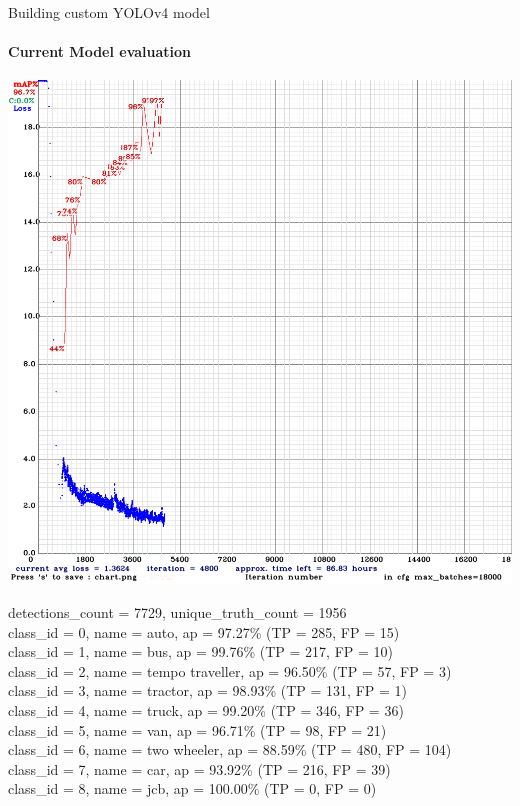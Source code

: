 \documentclass{beamer}
\begin{document}
	\begin{frame}[allowframebreaks]{Building custom YOLOv4 model}
		\framesubtitle{Current Model evaluation}
		\begin{center}
			\includegraphics[height=0.7\textheight]{res/darknet_training_chart}
		\end{center}
	
		\newpage
		\begin{scriptsize}
			detections\_count = 7729, unique\_truth\_count = 1956  \\ 
			class\_id = 0, name = auto, ap = 97.27\%   	 (TP = 285, FP = 15) \\
			class\_id = 1, name = bus, ap = 99.76\%   	 (TP = 217, FP = 10) \\
			class\_id = 2, name = tempo traveller, ap = 96.50\%   	 (TP = 57, FP = 3) \\
			class\_id = 3, name = tractor, ap = 98.93\%   	 (TP = 131, FP = 1) \\
			class\_id = 4, name = truck, ap = 99.20\%   	 (TP = 346, FP = 36) \\
			class\_id = 5, name = van, ap = 96.71\%   	 (TP = 98, FP = 21) \\
			class\_id = 6, name = two wheeler, ap = 88.59\%   	 (TP = 480, FP = 104) \\
			class\_id = 7, name = car, ap = 93.92\%   	 (TP = 216, FP = 39) \\
			class\_id = 8, name = jcb, ap = 100.00\%   	 (TP = 0, FP = 0) \\
			

\end{scriptsize}
\end{frame}
\end{document}
